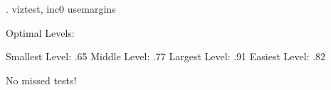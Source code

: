 . viztest, inc0 usemargins
 
Optimal Levels: 
 
Smallest Level: .65
Middle Level: .77
Largest Level: .91
Easiest Level: .82
 
No missed tests!
